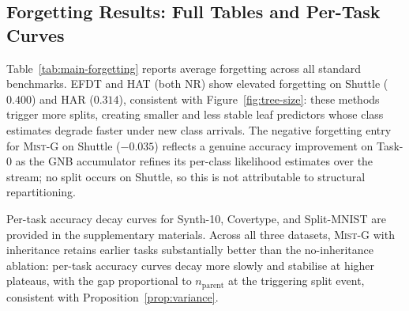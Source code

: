\documentclass{article}
\newcommand{\mist}{\textsc{Mist}}
\begin{document}
\subsection{Forgetting Results: Full Tables and Per-Task Curves}
\label{app:forgetting-full}

Table~\ref{tab:main-forgetting} reports average forgetting across all standard
benchmarks. EFDT and HAT (both NR) show elevated forgetting on Shuttle ($0.400$)
and HAR ($0.314$), consistent with Figure~\ref{fig:tree-size}: these methods
trigger more splits, creating smaller and less stable leaf predictors whose class
estimates degrade faster under new class arrivals. The negative forgetting entry
for \mist{}-G on Shuttle ($-0.035$) reflects a genuine accuracy improvement on
Task-0 as the GNB accumulator refines its per-class likelihood estimates over
the stream; no split occurs on Shuttle, so this is not attributable to structural
repartitioning.

Per-task accuracy decay curves for Synth-10, Covertype, and Split-MNIST are
provided in the supplementary materials. Across all three datasets, \mist{}-G
with inheritance retains earlier tasks substantially better than the
no-inheritance ablation: per-task accuracy curves decay more slowly and
stabilise at higher plateaus, with the gap proportional to $n_{\mathrm{parent}}$
at the triggering split event, consistent with Proposition~\ref{prop:variance}.
\end{document}
